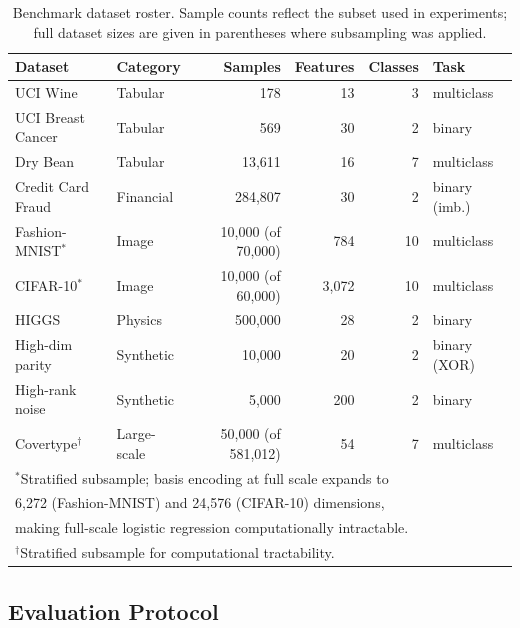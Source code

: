 \documentclass[12pt]{article}
\begin{document}
\begin{table}[tbp]
\centering
\caption{Benchmark dataset roster.  Sample counts reflect the subset used in
experiments; full dataset sizes are given in parentheses where subsampling
was applied.}
\label{tab:datasets}
\small
\begin{tabular}{llrrrl}
\toprule
Dataset & Category & Samples & Features & Classes & Task \\
\midrule
UCI Wine           & Tabular     & 178                     & 13      & 3  & multiclass \\
UCI Breast Cancer  & Tabular     & 569                     & 30      & 2  & binary \\
Dry Bean           & Tabular     & 13{,}611                & 16      & 7  & multiclass \\
Credit Card Fraud  & Financial   & 284{,}807               & 30      & 2  & binary (imb.) \\
Fashion-MNIST$^*$ & Image       & 10{,}000 (of 70{,}000)  & 784     & 10 & multiclass \\
CIFAR-10$^*$      & Image       & 10{,}000 (of 60{,}000)  & 3{,}072 & 10 & multiclass \\
HIGGS              & Physics     & 500{,}000               & 28      & 2  & binary \\
High-dim parity    & Synthetic   & 10{,}000                & 20      & 2  & binary (XOR) \\
High-rank noise    & Synthetic   & 5{,}000                 & 200     & 2  & binary \\
Covertype$^\dagger$ & Large-scale & 50{,}000 (of 581{,}012) & 54    & 7  & multiclass \\
\bottomrule
\multicolumn{6}{l}{\small$^*$Stratified subsample; basis encoding at full scale expands to} \\
\multicolumn{6}{l}{\small\phantom{$^*$}6{,}272 (Fashion-MNIST) and 24{,}576 (CIFAR-10) dimensions,} \\
\multicolumn{6}{l}{\small\phantom{$^*$}making full-scale logistic regression computationally intractable.} \\
\multicolumn{6}{l}{\small$^\dagger$Stratified subsample for computational tractability.} \\
\end{tabular}
\end{table}

\subsection{Evaluation Protocol}
\label{sec:protocol}
\end{document}
